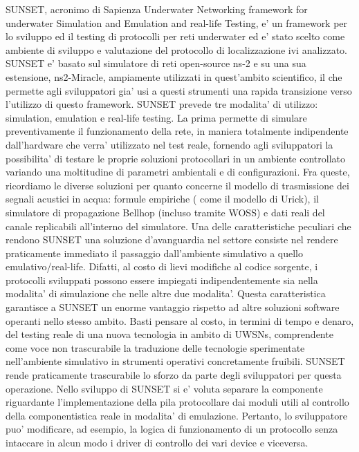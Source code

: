 SUNSET, acronimo di Sapienza Underwater Networking framework for underwater Simulation and Emulation and real-life Testing, e' un framework per lo sviluppo ed il testing di protocolli per reti underwater ed e' stato scelto come ambiente di sviluppo e valutazione del protocollo di localizzazione ivi analizzato.\newline
SUNSET e' basato sul simulatore di reti open-source ns-2 e su una sua estensione, ns2-Miracle, ampiamente utilizzati in quest'ambito scientifico, il che permette agli sviluppatori gia' usi a questi strumenti una rapida transizione verso l'utilizzo di questo framework.
SUNSET prevede tre modalita' di utilizzo: simulation, emulation e real-life testing.
La prima permette di simulare preventivamente il funzionamento della rete, in maniera totalmente indipendente dall'hardware che verra' utilizzato nel test reale, fornendo agli sviluppatori la possibilita' di testare le proprie soluzioni protocollari in un ambiente controllato variando una moltitudine di parametri ambientali e di configurazioni. Fra queste, ricordiamo le diverse soluzioni per quanto concerne il modello di trasmissione dei segnali acustici in acqua: formule empiriche ( come il modello di Urick), il simulatore di propagazione Bellhop (incluso tramite WOSS) e dati reali del canale replicabili all'interno del simulatore.
\newline
Una delle caratteristiche peculiari che rendono SUNSET una soluzione d'avanguardia nel settore consiste nel rendere praticamente immediato il passaggio dall'ambiente simulativo a quello emulativo/real-life. Difatti, al costo di lievi modifiche al codice sorgente, i protocolli sviluppati possono essere impiegati indipendentemente sia nella modalita' di simulazione che nelle altre due modalita'. Questa caratteristica garantisce a SUNSET un enorme vantaggio rispetto ad altre soluzioni software operanti nello stesso ambito. Basti pensare al costo, in termini di tempo e denaro, del testing reale di una nuova tecnologia in ambito di UWSNs, comprendente come voce non trascurabile la traduzione delle tecnologie sperimentate nell'ambiente simulativo in strumenti operativi concretamente fruibili. SUNSET rende praticamente trascurabile lo sforzo da parte degli sviluppatori per questa operazione.
\newline
Nello sviluppo di SUNSET si e' voluta separare la componente riguardante l'implementazione della pila protocollare dai moduli utili al controllo della componentistica reale in modalita' di emulazione. Pertanto, lo sviluppatore puo' modificare, ad esempio, la logica di funzionamento di un protocollo senza intaccare in alcun modo i driver di controllo dei vari device e viceversa.
